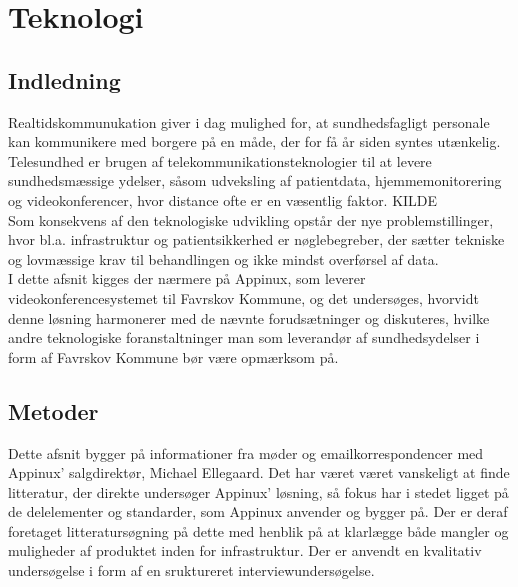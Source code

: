 \chapter{Teknologi}

\section{Indledning}

Realtidskommunukation giver i dag mulighed for, at sundhedsfagligt personale kan kommunikere med borgere på en måde, der for få år siden syntes utænkelig.
\\Telesundhed er brugen af telekommunikationsteknologier til at levere sundhedsmæssige ydelser, såsom udveksling af patientdata, hjemmemonitorering og videokonferencer, hvor distance ofte er en væsentlig faktor. KILDE\\
Som konsekvens af den teknologiske udvikling opstår der nye problemstillinger, hvor bl.a. infrastruktur og patientsikkerhed er nøglebegreber, der sætter tekniske og lovmæssige krav til behandlingen og ikke mindst overførsel af data.
\\
I dette afsnit kigges der nærmere på Appinux, som leverer videokonferencesystemet til Favrskov Kommune, og det undersøges, hvorvidt denne løsning harmonerer med de nævnte forudsætninger og diskuteres, hvilke andre teknologiske foranstaltninger man som leverandør af sundhedsydelser i form af Favrskov Kommune bør være opmærksom på.

\section{Metoder}
Dette afsnit bygger på informationer fra møder og emailkorrespondencer med Appinux' salgdirektør, Michael Ellegaard. Det har været været vanskeligt at finde litteratur, der direkte undersøger Appinux' løsning, så fokus har i stedet ligget på de delelementer og standarder, som Appinux anvender og bygger på. Der er deraf foretaget litteratursøgning på dette med henblik på at klarlægge både mangler og muligheder af produktet inden for infrastruktur. Der er anvendt en kvalitativ undersøgelse i form af en sruktureret interviewundersøgelse.

